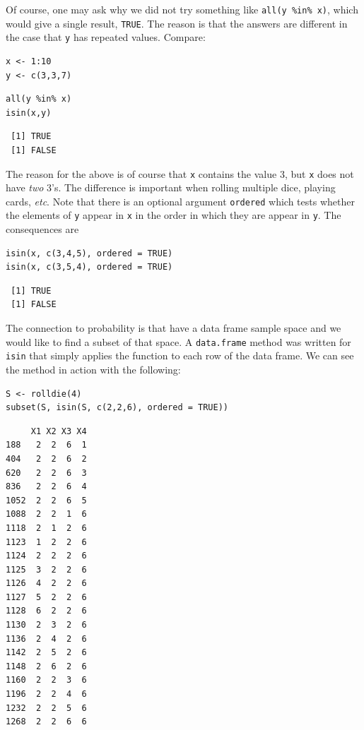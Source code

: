 \documentclass[captions=tableheading]{scrbook}
\begin{document}
Of course, one may ask why we did not try something like \texttt{all(y \%in\% x)}, which would give a single result, \texttt{TRUE}. The reason is that the answers are different in the case that \texttt{y} has repeated values. Compare: 


\begin{verbatim}
x <- 1:10 
y <- c(3,3,7)
\end{verbatim}


\begin{verbatim}
all(y %in% x)
isin(x,y)
\end{verbatim}

\begin{verbatim}
 [1] TRUE
 [1] FALSE
\end{verbatim}

The reason for the above is of course that \texttt{x} contains the value 3, but \texttt{x} does not have \emph{two} 3's. The difference is important when rolling multiple dice, playing cards, \emph{etc}. Note that there is an optional argument \texttt{ordered} which tests whether the elements of \texttt{y} appear in \texttt{x} in the order in which they are appear in \texttt{y}. The consequences are 


\begin{verbatim}
isin(x, c(3,4,5), ordered = TRUE) 
isin(x, c(3,5,4), ordered = TRUE)
\end{verbatim}

\begin{verbatim}
 [1] TRUE
 [1] FALSE
\end{verbatim}

The connection to probability is that have a data frame sample space and we would like to find a subset of that space. A \texttt{data.frame} method was written for \texttt{isin} that simply applies the function to each row of the data frame. We can see the method in action with the following: 


\begin{verbatim}
S <- rolldie(4) 
subset(S, isin(S, c(2,2,6), ordered = TRUE))
\end{verbatim}


\begin{verbatim}
     X1 X2 X3 X4
188   2  2  6  1
404   2  2  6  2
620   2  2  6  3
836   2  2  6  4
1052  2  2  6  5
1088  2  2  1  6
1118  2  1  2  6
1123  1  2  2  6
1124  2  2  2  6
1125  3  2  2  6
1126  4  2  2  6
1127  5  2  2  6
1128  6  2  2  6
1130  2  3  2  6
1136  2  4  2  6
1142  2  5  2  6
1148  2  6  2  6
1160  2  2  3  6
1196  2  2  4  6
1232  2  2  5  6
1268  2  2  6  6
\end{verbatim}
\end{document}
